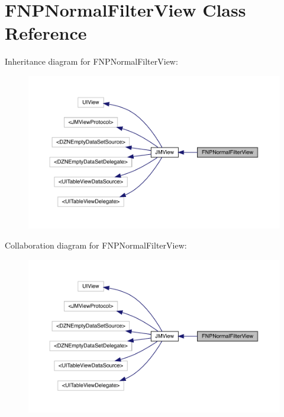 \hypertarget{interface_f_n_p_normal_filter_view}{}\section{F\+N\+P\+Normal\+Filter\+View Class Reference}
\label{interface_f_n_p_normal_filter_view}


Inheritance diagram for F\+N\+P\+Normal\+Filter\+View\+:\nopagebreak
\begin{figure}[H]
\begin{center}
\leavevmode
\includegraphics[width=350pt]{interface_f_n_p_normal_filter_view__inherit__graph}
\end{center}
\end{figure}


Collaboration diagram for F\+N\+P\+Normal\+Filter\+View\+:\nopagebreak
\begin{figure}[H]
\begin{center}
\leavevmode
\includegraphics[width=350pt]{interface_f_n_p_normal_filter_view__coll__graph}
\end{center}
\end{figure}
